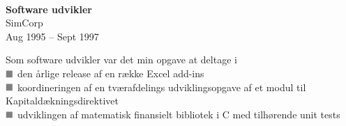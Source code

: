\documentclass[10pt, a4paper]{article}
\newcommand*{\greysquare}{\textcolor{gray}{\blacksquare}}
\begin{document}
\\[0.5cm]
\begin{Row}%
  \begin{Cell}{1}
    \textbf{Software udvikler} \\ [1ex]
    SimCorp \\
    Aug 1995 -- Sept 1997 %
  \end{Cell}
  \begin{Cell}{3}
    Som software udvikler var det min opgave at deltage i \\ [1ex]
    $\greysquare$ den årlige release af en række Excel add-ins \\
    $\greysquare$ koordineringen af en tværafdelings udviklingsopgave af et modul til Ka\-pi\-tal\-dæk\-nings\-di\-rek\-ti\-vet \\
    $\greysquare$ udviklingen af matematisk finansielt bibliotek i C med tilhørende unit tests
  \end{Cell}
\end{Row}

\end{document}
